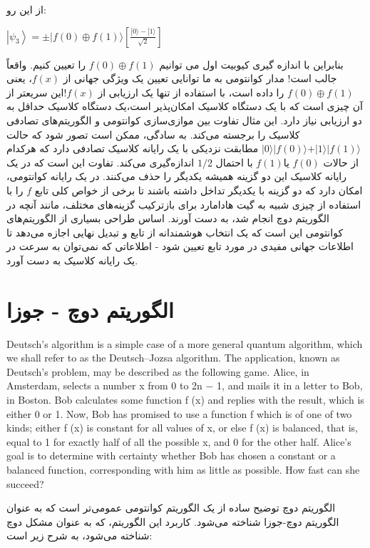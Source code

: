 \documentclass{book}
\begin{document}
از این رو:

\begin{center}
	$\left|\psi_3\right\rangle= \pm|f(0) \oplus f(1)\rangle\left[\frac{|0\rangle-|1\rangle}{\sqrt{2}}\right]$
\end{center}
بنابراین با اندازه گیری کیوبیت اول می توانیم $f(0) \oplus f(1)$ را تعیین کنیم. واقعاً جالب است! مدار کوانتومی به ما توانایی تعیین یک ویژگی جهانی از $f(x)$، یعنی$ f(0)\oplus f(1)$ را داده است، با استفاده از تنها یک ارزیابی از $f(x)$!این سریعتر از آن چیزی است که با یک دستگاه کلاسیک امکان‌پذیر است،یک دستگاه کلاسیک حداقل به دو ارزیابی نیاز دارد.
این مثال تفاوت بین موازی‌سازی کوانتومی و الگوریتم‌های تصادفی کلاسیک را برجسته می‌کند. به سادگی، ممکن است تصور شود که حالت $\vert0\rangle \vert f(0) \rangle + \vert1\rangle \vert f(1) \rangle$ مطابقت نزدیکی با یک رایانه کلاسیک تصادفی دارد که هرکدام از حالات $ f (0)$ یا$ f (1) $ با احتمال $1/2$ اندازه‌گیری می‌کند.
تفاوت این است که در یک رایانه کلاسیک این دو گزینه همیشه یکدیگر را حذف می‌کنند. در یک رایانه کوانتومی، امکان دارد که دو گزینه با یکدیگر تداخل داشته باشند تا برخی از خواص کلی تابع $f$ را با استفاده از چیزی شبیه به گیت هادامارد برای بازترکیب گزینه‌های مختلف، مانند آنچه در الگوریتم دوچ انجام شد، به دست آورند.
اساس طراحی بسیاری از الگوریتم‌های کوانتومی این است که یک انتخاب هوشمندانه از تابع و تبدیل نهایی اجازه می‌دهد تا اطلاعات جهانی مفیدی در مورد تابع تعیین شود - اطلاعاتی که نمی‌توان به سرعت در یک رایانه کلاسیک به دست آورد.

\section{الگوریتم دوچ - جوزا}
Deutsch’s algorithm is a simple case of a more general quantum algorithm, which we shall
refer to as the Deutsch–Jozsa algorithm. The application, known as Deutsch’s problem,
may be described as the following game. Alice, in Amsterdam, selects a number x from
0 to 2n − 1, and mails it in a letter to Bob, in Boston. Bob calculates some function
f (x) and replies with the result, which is either 0 or 1. Now, Bob has promised to use
a function f which is of one of two kinds; either f (x) is constant for all values of x,
or else f (x) is balanced, that is, equal to 1 for exactly half of all the possible x, and 0
for the other half. Alice’s goal is to determine with certainty whether Bob has chosen a
constant or a balanced function, corresponding with him as little as possible. How fast
can she succeed?

الگوریتم دوچ توضیح ساده از یک الگوریتم کوانتومی عمومی‌تر است که به عنوان الگوریتم دوچ-جوزا شناخته می‌شود. کاربرد این الگوریتم، که به عنوان مشکل دوچ شناخته می‌شود، به شرح زیر است:
\end{document}
